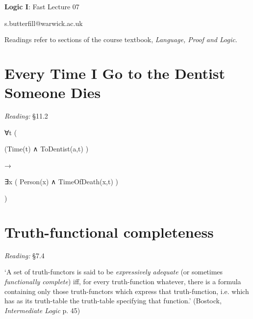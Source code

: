 \documentclass[12pt]{extarticle}
\date{}
\makeatletter
\def \ititle {Origins of Mind}
\def \isubtitle {Lecture 08}
\def \iemail{s.butterfill@warwick.ac.uk}
\makeatother
\begin{document}
\raggedcolumns

\begin{multicols*}{3}

\setlength\footnotesep{1em}







\def \ititle {Logic I}
 
\def \isubtitle {Fast Lecture 07}
 
\begin{center}
 
{\Large
 
\textbf{\ititle}: \isubtitle
 
}
 
 
 
\iemail %
 
\end{center}
 
Readings refer to sections of the course textbook, \emph{Language, Proof and Logic}.
 
 
 
\section{Every Time I Go to the Dentist Someone Dies}
 
\emph{Reading:} §11.2
 
∀t (
 
\hspace{5mm} (Time(t) ∧ ToDentist(a,t) )
 
\hspace{5mm} →
 
\hspace{5mm} ∃x ( Person(x) ∧ TimeOfDeath(x,t) )
 
)
 
\vfill
\columnbreak

\section{Truth-functional completeness}
 
\emph{Reading:} §7.4
 
‘A set of truth-functors is said to be \emph{expressively adequate} (or sometimes \emph{functionally complete}) iff, for every truth-function whatever, there is a formula containing only those truth-functors which express that truth-function, i.e. which has as its truth-table the truth-table specifying that function.’ (Bostock, \emph{Intermediate Logic} p. 45)
 

\end{multicols*}
\end{document}
